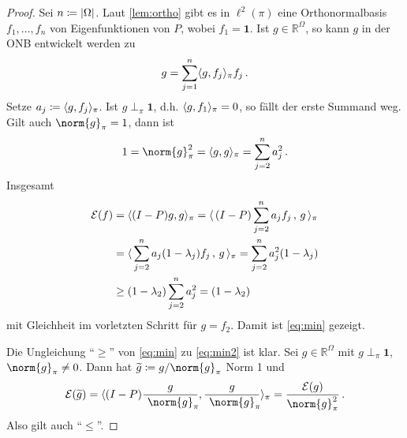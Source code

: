 \documentclass[ngerman,a4paper,11pt]{scrartcl}
\newcommand{\fracnorm}[3]{%
    \ensuremath{\frac{\! #1\!}{\! {}_{\phantom{#3}}\norm{#2}_{#3}\!}}%
}
\newcommand{\diri}{\mathcal{E}}
\newcommand{\RR}{\mathbb{R}}
\DeclarePairedDelimiter{\sprod}{\langle}{\rangle}	%
\DeclarePairedDelimiter{\abs}{\lvert}{\rvert}		%
\begin{document}


\begin{proof} %
 Sei $n\coloneqq\abs{\Omega}$. Laut \cref{lem:ortho} gibt es in $\ell^2(\pi)$ eine
 Orthonormalbasis $f_1,\dotsc,f_n$ von Eigenfunktionen von $P$, wobei $f_1=\mathbf{1}$. Ist
 $g\in\RR^\Omega$, so kann $g$ in der ONB entwickelt werden zu
 \begin{equation*}
  g=\sum_{j=1}^n\sprod{g,f_j}_\pi f_j\, . 
 \end{equation*}
 Setze $a_j\coloneqq\sprod{g,f_j}_\pi$.
 Ist $g\perp_\pi\mathbf{1}$, d.h. $\sprod{g,f_1}_\pi=0$, so fällt der erste
 Summand weg. Gilt auch $\norm{g}_\pi=1$, dann ist
 \begin{equation*}
  1=\norm{g}_\pi^2=\sprod{g,g}_\pi=\sum_{j=2}^na_j^2\, .
 \end{equation*}
 Insgesamt
 \begin{align*}
  \diri(f)&=\sprod{(I-P)g,g}_\pi=\sprod{\, (I-P)\sum_{j=2}^n a_j f_j\, ,\, g\,}_\pi \\
          &=\sprod{\, \sum_{j=2}^n a_j (1-\lambda_j)f_j\, ,\, g\, }_\pi=\sum_{j=2}^na_j^2 (1-\lambda_j) \\
          &\geq(1-\lambda_2)\sum_{j=2}^n a_j^2=(1-\lambda_2)
 \end{align*}
 mit Gleichheit im vorletzten Schritt für $g=f_2$. Damit ist \cref{eq:min} gezeigt.
 
 Die Ungleichung \enquote{$\geq$} von \eqref{eq:min} zu \eqref{eq:min2} ist klar. Sei
 $g\in\RR^\Omega$ mit $g\perp_\pi\mathbf{1}$, $\norm{g}_\pi\neq0$. Dann hat
 $\widetilde{g}\coloneqq g/\norm{g}_\pi$ Norm 1 und 
 \begin{equation*}
  \diri(\widetilde{g})=\sprod{(I-P)\fracnorm{g}{g}{\pi},\fracnorm{g}{g}{\pi}}_\pi=\frac{\diri(g)}{\norm{g}_\pi^2}\, .
 \end{equation*}
 Also gilt auch \enquote{$\leq$}.
\end{proof}
\end{document}
